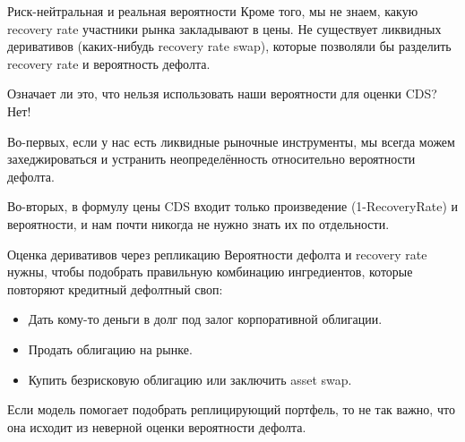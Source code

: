 \documentclass{beamer}
\begin{document}
\begin{frame}{Риск-нейтральная и реальная вероятности}
\justify
Кроме того, мы не знаем, какую recovery rate участники рынка закладывают в цены. Не существует ликвидных деривативов (каких-нибудь recovery rate swap), которые позволяли бы разделить recovery rate и вероятность дефолта.

\justify
Означает ли это, что нельзя использовать наши вероятности для оценки CDS? Нет!

\justify
Во-первых, если у нас есть ликвидные рыночные инструменты, мы всегда можем захеджироваться и устранить неопределённость относительно вероятности дефолта.

\justify
Во-вторых, в формулу цены CDS входит только произведение (1-RecoveryRate) и вероятности, и нам почти никогда не нужно знать их по отдельности.
\end{frame}



\begin{frame}{Оценка деривативов через репликацию}
\justify
Вероятности дефолта и recovery rate нужны, чтобы подобрать правильную комбинацию 
ингредиентов, которые повторяют кредитный дефолтный своп:

\justify
\begin{itemize}
\justifying
\item Дать кому-то деньги в долг под залог корпоративной облигации.
\item Продать облигацию на рынке.
\item Купить безрисковую облигацию или заключить asset swap.
\end{itemize}

\justify
Если модель помогает подобрать реплицирующий портфель, то не так важно, что она исходит из неверной оценки вероятности дефолта.
\end{frame}
\end{document}
